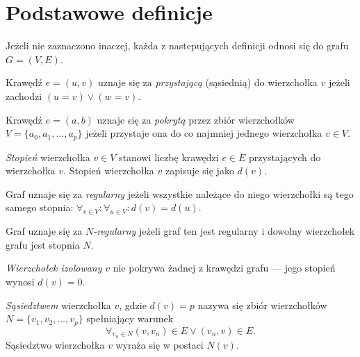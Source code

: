 \section{Podstawowe definicje}\label{s_definitions}

Jeżeli nie zaznaczono inaczej, każda z nastepujących definicji odnosi się do
grafu $G=(V,E)$.

\begin{definition}
  Krawędź $e=(u,v)$ uznaje się za \emph{przystającą} (sąsiednią) do wierzchołka $v$
  jeżeli zachodzi $(u=v) \lor (w=v)$.
\end{definition}

\begin{definition}
  Krawędź $e=(a,b)$ uznaje się za \emph{pokrytą} przez zbiór wierzchołków \\
  $V=\{a_0, a_1, \ldots, a_p\}$ jeżeli przystaje ona do co najmniej jednego
  wierzchołka $v \in V$.
\end{definition}

\begin{definition}
  \emph{Stopień} wierzchołka $v \in V$ stanowi liczbę krawędzi $e \in E$ przystających do wierzchołka $v$.
  Stopień wierzchołka $v$ zapisuje się jako $d(v)$.
\end{definition}

\begin{definition}
  Graf uznaje się za \emph{regularny} jeżeli wszystkie należące do niego wierzchołki są tego samego stopnia: $\forall_{v \in V}: \forall_{u \in V}:{d(v)=d(u)}$.
\end{definition}

\begin{definition}
  Graf uznaje się za \emph{$N$-regularny} jeżeli graf ten jest regularny i dowolny wierzchołek grafu jest stopnia $N$.
\end{definition}

\begin{definition}
  \emph{Wierzchołek izolowany} $v$ nie pokrywa żadnej z krawędzi grafu --- jego stopień wynosi $d(v)=0$.
\end{definition}

\begin{definition}
  \emph{Sąsiedztwem} wierzchołka $v$, gdzie $d(v)=p$ nazywa się zbiór wierzchołków $N=\{v_1, v_2, \ldots, v_p\}$ spełniający warunek 
  \[\forall_{v_n \in N}{(v,v_n) \in E \lor (v_n,v) \in E}.\]
  Sąsiedztwo wierzchołka $v$ wyraża się w postaci $N(v)$.
\end{definition}

